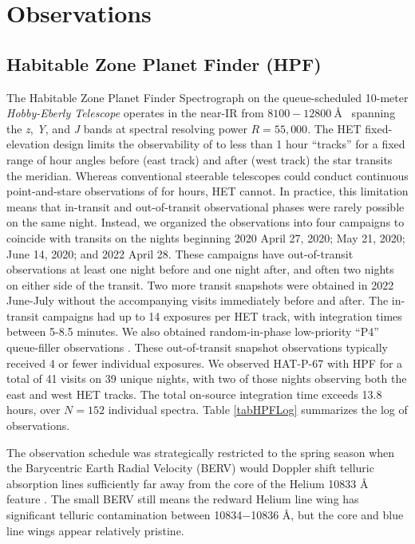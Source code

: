 \documentclass[twocolumn]{aastex631}
\begin{document}
\section{Observations}
\subsection{Habitable Zone Planet Finder (HPF)}

The Habitable Zone Planet Finder Spectrograph \citep[HPF;][]{2012SPIE.8446E..1SM,2014SPIE.9147E..1GM, 2019Optic...6..233M} on the queue-scheduled 10-meter \emph{Hobby-Eberly Telescope} \citep[HET;][]{1998SPIE.3352...34R} operates in the near-IR from $8100-12800~$\AA~ spanning the \textit{z}, \textit{Y}, and \textit{J} bands at spectral resolving power $R=55,000$. The HET fixed-elevation design \citep{2007PASP..119..556S} limits the observability of  to less than 1 hour ``tracks'' for a fixed range of hour angles before (east track) and after (west track) the star transits the meridian.  Whereas conventional steerable telescopes could conduct continuous point-and-stare observations of  for hours, HET cannot.  In practice, this limitation means that in-transit and out-of-transit observational phases were rarely possible on the same night.  Instead, we organized the observations into four campaigns to coincide with  transits on the nights beginning 2020 April 27, 2020; May 21, 2020; June 14, 2020; and 2022 April 28.  These campaigns have out-of-transit observations at least one night before and one night after, and often two nights on either side of the transit.  Two more transit snapshots were obtained in 2022 June-July without the accompanying visits immediately before and after.  The in-transit campaigns had up to 14 exposures per HET track, with integration times between 5-8.5 minutes.  We also obtained random-in-phase low-priority ``P4'' queue-filler observations \citep{2007PASP..119..556S}.  These out-of-transit snapshot observations typically received 4 or fewer individual exposures.  We observed HAT-P-67 with HPF for a total of 41 visits on 39 unique nights, with two of those nights observing both the east and west HET tracks.  The total on-source integration time exceeds 13.8 hours, over $N=152$ individual spectra.  Table \ref{tabHPFLog} summarizes the log of observations.

The observation schedule was strategically restricted to the spring season when the Barycentric Earth Radial Velocity (BERV) would Doppler shift telluric absorption lines sufficiently far away from the core of the Helium 10833 \AA~ feature \citep{2022ApJ...939L..11S}.  The small BERV still means the redward Helium line wing has significant telluric contamination between 10834$-$10836 \AA, but the core and blue line wings appear relatively pristine.
\end{document}
